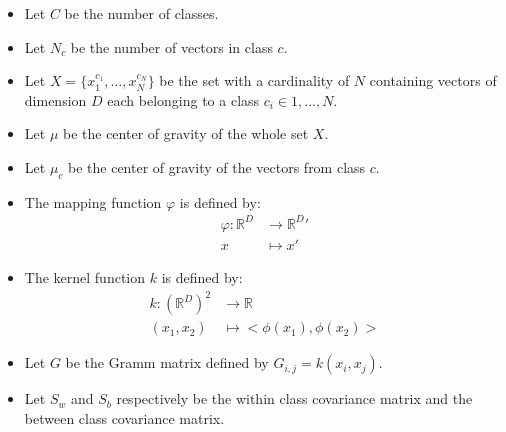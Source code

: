 
\begin{itemize}
  \item Let $C$ be the number of classes.
  \item Let $N_c$ be the number of vectors in class $c$.
  \item Let $X = \{x^{c_1}_1, \ldots, x^{c_N}_N\}$ be the set with a cardinality of $N$ containing
  vectors of dimension $D$ each belonging to a class $c_i \in {1, ..., N}$.
  \item Let $\mu$ be the center of gravity of the whole set $X$.
  \item Let $\mu_c$ be the center of gravity of the vectors from class $c$.
  \item The mapping function $\varphi$ is defined by:
  	\begin{align*}
   		\varphi : \mathbb{R}^D &\to \mathbb{R}^D'\\
   		x &\mapsto x'
   	\end{align*}
  \item The kernel function $k$ is defined by:
  	\begin{align*}
   		k : \left(\mathbb{R}^D\right)^2 &\to \mathbb{R}\\
   		(x_1, x_2) &\mapsto <\phi(x_1), \phi(x_2)>
   	\end{align*}
  \item Let $G$ be the Gramm matrix defined by $G_{i,j} = k(x_i, x_j)$.
  \item Let $S_w$ and $S_b$ respectively be the within class covariance matrix and the between class covariance matrix. 
\end{itemize}
